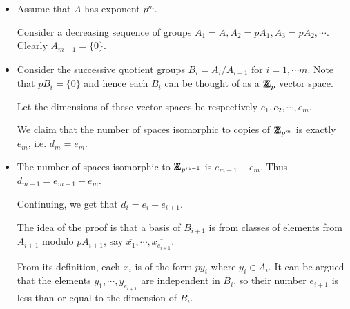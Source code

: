 \documentclass[12pt]{article}
\def\DZ{ \mbox{\rm Z \kern -0.75em Z} }
\begin{document}
\begin{enumerate}
\begin{itemize}
\item Assume that $A$ has exponent $p^m$.

Consider a decreasing sequence of groups $A_1=A,
A_2=pA_1,A_3=pA_2,\cdots$. Clearly $A_{m+1}=\{0\}$.



\item
Consider the successive quotient groups $B_i=A_i/A_{i+1}$ for
$i=1,\cdots m$. Note that $pB_i=\{0\}$ and hence each $B_i$ can be
thought of as a $\DZ_p$ vector space.

Let the dimensions of these vector
spaces be respectively $e_1,e_2,\cdots,e_m$.

We claim that the number of spaces isomorphic to copies of $\DZ_{p^m}$
is exactly $e_m$, i.e. $d_m=e_m$.

\item The number of spaces isomorphic to $\DZ_{p^{m-1}}$ is
$e_{m-1}-e_m$. Thus $d_{m-1}=e_{m-1}-e_m$.

Continuing, we get that $d_i=e_i-e_{i+1}$.

The idea of the proof is that a basis of $B_{i+1}$ is from classes of
elements from $A_{i+1}$ modulo $pA_{i+1}$, say
$\overline{x_1},\cdots,\overline{x_{e_{i+1}}}$.

From its definition, each $x_i$ is of the form $py_i$ where $y_i\in
A_i$. It can be argued that the elements
$\overline{y_1},\cdots,\overline{y_{e_{i+1}}}$ are independent in $B_i$,
so their number $e_{i+1}$ is less than or equal to the dimension of
$B_i$.

\end{itemize}
\end{enumerate}

\vspace*{\fill}
\printindex
\end{document}
